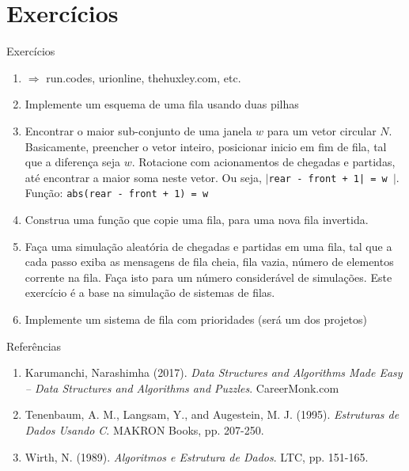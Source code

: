 \section{Exercícios}
\begin{frame}{Exercícios}
	
	\begin{enumerate}
	
	\item $\Rightarrow $ run.codes, urionline, thehuxley.com, etc.
	
	\item Implemente um esquema de uma fila usando duas pilhas
	
	\item Encontrar o maior sub-conjunto de uma janela $w$ para um vetor circular
	$N$. Basicamente, preencher o vetor inteiro, posicionar inicio em fim de fila,
	tal que a diferença seja $w$. Rotacione com acionamentos de 
	chegadas e partidas, até encontrar a maior soma neste vetor. Ou seja,
  \texttt{$\mid $rear - front + 1| = w $\mid $}. 
  Função: \texttt{abs(rear - front + 1) = w}
	 

	\item Construa uma função que copie uma fila, para uma nova fila invertida.
	
	\item Faça uma simulação aleatória de chegadas e partidas em uma fila,	tal que a cada passo exiba as mensagens de fila cheia, fila vazia, 	número de elementos corrente na fila. Faça isto para um número considerável	de simulações. Este exercício é a base na simulação de sistemas de filas.
	
	\item Implemente um sistema de fila com prioridades (será um dos projetos)
	
	
	\end{enumerate}
	
\end{frame}





\begin{frame}{Referências}
	
	\begin{enumerate}
	
		\item Karumanchi, Narashimha (2017). 
		\textit{Data Structures and Algorithms Made Easy -- Data Structures and Algorithms
		and Puzzles}.  CareerMonk.com

		\item Tenenbaum, A. M., Langsam, Y., and Augestein, M. J. (1995). 
		\textit{Estruturas de Dados Usando C}. MAKRON Books, pp. 207-250.

		\item Wirth, N. (1989). \textit{Algoritmos e Estrutura de Dados}. 
		LTC, pp. 151-165.
	
	
	
	\end{enumerate}
	
\end{frame}
